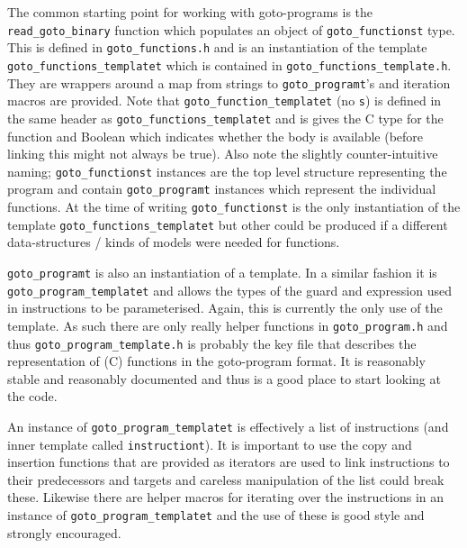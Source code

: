 \documentclass{article}
\newcommand{\file}[1]{\texttt{#1}}
\newcommand{\code}[1]{\texttt{#1}}
\begin{document}
The common starting point for working with goto-programs is the
\code{read\_goto\_binary} function which populates an object of
\code{goto\_functionst} type.  This is defined in
\file{goto\_functions.h} and is an instantiation of the template
\code{goto\_functions\_templatet} which is contained in
\file{goto\_functions\_template.h}.  They are wrappers around a map from
strings to \code{goto\_programt}'s and iteration macros are provided.
Note that \code{goto\_function\_templatet} (no \code{s}) is defined in
the same header as \code{goto\_functions\_templatet} and is gives the
C type for the function and Boolean which indicates whether the body
is available (before linking this might not always be true).  Also
note the slightly counter-intuitive naming; \code{goto\_functionst}
instances are the top level structure representing the program and
contain \code{goto\_programt} instances which represent the individual
functions.  At the time of writing \code{goto\_functionst} is the only
instantiation of the template \code{goto\_functions\_templatet} but
other could be produced if a different data-structures / kinds of models
were needed for functions.

\code{goto\_programt} is also an instantiation of a template.  In a
similar fashion it is \code{goto\_program\_templatet} and allows the
types of the guard and expression used in instructions to be
parameterised.  Again, this is currently the only use of the template.
As such there are only really helper functions in
\file{goto\_program.h} and thus \code{goto\_program\_template.h} is
probably the key file that describes the representation of (C)
functions in the goto-program format.  It is reasonably stable and
reasonably documented and thus is a good place to start looking at the code.

An instance of \code{goto\_program\_templatet} is effectively a list
of instructions (and inner template called \code{instructiont}).  It
is important to use the copy and insertion functions that are provided
as iterators are used to link instructions to their predecessors and
targets and careless manipulation of the list could break these.
Likewise there are helper macros for iterating over the instructions
in an instance of \code{goto\_program\_templatet} and the use of these
is good style and strongly encouraged.
\end{document}
